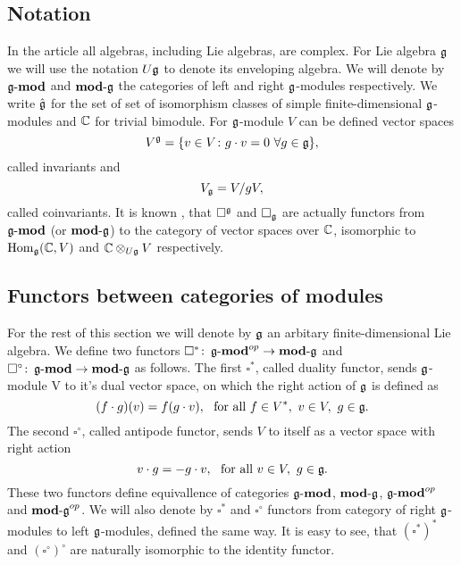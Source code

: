 % 

\subsection{Notation} 
In the article all algebras, including Lie algebras, are complex.  For Lie algebra $\mathfrak{g}$ we will
use the notation $U\mathfrak{g}$ to denote its enveloping algebra. We will denote by $\operatorname{\mathbf{\mathfrak{g}-mod}}$ and
$\operatorname{\mathbf{mod-\mathfrak{g}}}$ the categories of left and right $\mathfrak{g}$-modules respectively.  We write $\hat{\mathfrak{g}}$
for the set of set of isomorphism classes of simple finite-dimensional $\mathfrak{g}$-modules and $\mathbb{C}$
for trivial bimodule.  For $\mathfrak{g}$-module $V$ can be defined vector spaces 
\begin{equation}
    V^{\mathfrak{g}} = \{v\in V\colon g\cdot v = 0 ~ \forall g\in \mathfrak{g} \}, 
\end{equation}
called invariants and
\begin{equation}
    V_{\mathfrak{g}} = V/gV,
\end{equation}
called coinvariants. It is known , that $\square^{\mathfrak{g}}$ and $\square_{\mathfrak{g}}$ are actually
functors from $\operatorname{\mathbf{\mathfrak{g}-mod}}$ (or $\operatorname{\mathbf{mod-\mathfrak{g}}}$) to the category of vector spaces over $\mathbb{C}$,
isomorphic to $\operatorname{Hom}_{\mathfrak{g}}(\mathbb{C}, V)$ and $\mathbb{C} \otimes_{U\mathfrak{g}} V$ respectively. 

\subsection{Functors between categories of modules}
For the rest of this section we will denote by $\mathfrak{g}$ an arbitary finite-dimensional Lie algebra.
We define two functors $\square^*\colon \operatorname{\mathbf{\mathfrak{g}-mod}}^{op} \to \operatorname{\mathbf{mod-\mathfrak{g}}}$ and
$\square^\circ\colon \operatorname{\mathbf{\mathfrak{g}-mod}} \to \operatorname{\mathbf{mod-\mathfrak{g}}}$ as follows. The first $\square^*$, called
duality functor, sends $\mathfrak{g}$-module V to it's dual vector space, on which the right action of
$\mathfrak{g}$ is defined as 
\[
    (f\cdot g) (v) = f(g\cdot v),~\text{ for all } f\in V^*,~v \in V,~g\in\mathfrak{g}.
\]
The second $\square^\circ$, called antipode functor, sends $V$ to itself as a vector space with right
action
\[
    v\cdot g = - g\cdot v,~\text{ for all } v \in V,~g\in\mathfrak{g}.
\]
These two functors define equivallence of categories $\operatorname{\mathbf{\mathfrak{g}-mod}}$, $\operatorname{\mathbf{mod-\mathfrak{g}}}$, $\operatorname{\mathbf{\mathfrak{g}-mod}}^{op}$
and $\operatorname{\mathbf{mod-\mathfrak{g}}}^{op}$. We will also denote by $\square^*$ and $\square^\circ$ functors from
category of right $\mathfrak{g}$-modules to left $\mathfrak{g}$-modules, defined the same way. It is easy to see,
that $(\square^*)^*$ and $(\square^\circ)^\circ$ are naturally isomorphic to the identity functor.

